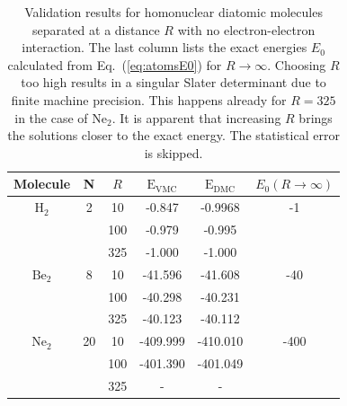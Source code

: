 \setlength{\tabcolsep}{0.6cm}
\begin{table}
\begin{center}
\begin{tabular}{cc|cccc}
 Molecule &   N     & $R$ & $\mathrm{E_{VMC}}$ & $\mathrm{E_{DMC}}$ & $E_0(R\to\infty)$\\
\hline
 $\mathrm{H}_2$  & 2     & 10  &   -0.847    &  -0.9968    & -1  \\
   &       & 100  &  -0.979    &  -0.995  &  \\
   &       & 325   &  -1.000    &  -1.000  &  \\
 $\mathrm{Be}_2$  & 8     & 10  &  -41.596     &  -41.608   & -40 \\
  &        & 100 &  -40.298     &  -40.231   &     \\
   &       & 325 &  -40.123     &  -40.112   &     \\
 $\mathrm{Ne}_2$ &  20    & 10  &  -409.999    &  -410.010  & -400\\
  &        & 100 &  -401.390    &  -401.049  &     \\
  &        & 325 &  -           &  -         &     \\
\end{tabular}
\caption{Validation results for homonuclear diatomic molecules separated at a distance $R$ with no electron-electron interaction. The last column lists the exact energies $E_0$ calculated from Eq.~(\ref{eq:atomsE0}) for $R\to\infty$. Choosing $R$ too high results in a singular Slater determinant due to finite machine precision. This happens already for $R=325$ in the case of  $\mathrm{Ne}_2$. It is apparent that increasing $R$ brings the solutions closer to the exact energy. The statistical error is skipped.}
\label{tab:res_valid_molecules}
\end{center}
\end{table}
\setlength{\tabcolsep}{6pt}


